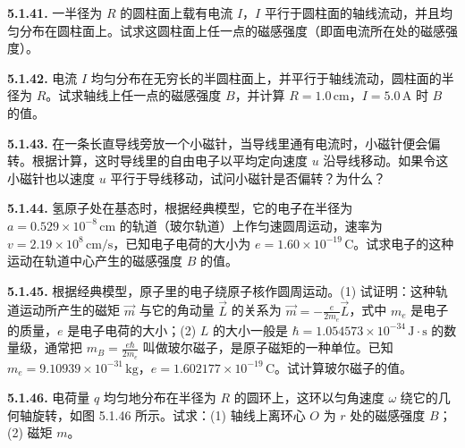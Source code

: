\begin{center}
\end{center}

\vfill
\newpage

\textbf{5.1.41.} 一半径为 $R$ 的圆柱面上载有电流 $I$，$I$ 平行于圆柱面的轴线流动，并且均匀分布在圆柱面上。试求这圆柱面上任一点的磁感强度（即面电流所在处的磁感强度）。

\vfill
\newpage

\textbf{5.1.42.} 电流 $I$ 均匀分布在无穷长的半圆柱面上，并平行于轴线流动，圆柱面的半径为 $R$。试求轴线上任一点的磁感强度 $B$，并计算 $R = 1.0\,\mathrm{cm}$，$I = 5.0\,\mathrm{A}$ 时 $B$ 的值。

\vfill
\newpage

\textbf{5.1.43.} 在一条长直导线旁放一个小磁针，当导线里通有电流时，小磁针便会偏转。根据计算，这时导线里的自由电子以平均定向速度 $u$ 沿导线移动。如果令这小磁针也以速度 $u$ 平行于导线移动，试问小磁针是否偏转？为什么？

\vfill
\newpage

\textbf{5.1.44.} 氢原子处在基态时，根据经典模型，它的电子在半径为 $a = 0.529 \times 10^{-8}\,\mathrm{cm}$ 的轨道（玻尔轨道）上作匀速圆周运动，速率为 $v = 2.19 \times 10^{8}\,\mathrm{cm/s}$，已知电子电荷的大小为 $e = 1.60 \times 10^{-19}\,\mathrm{C}$。试求电子的这种运动在轨道中心产生的磁感强度 $B$ 的值。

\vfill
\newpage

\textbf{5.1.45.} 根据经典模型，原子里的电子绕原子核作圆周运动。(1) 试证明：这种轨道运动所产生的磁矩 $\vec{m}$ 与它的角动量 $\vec{L}$ 的关系为 $\displaystyle \vec{m} = -\frac{e}{2m_{e}}\vec{L}$，式中 $m_{e}$ 是电子的质量，$e$ 是电子电荷的大小；(2) $L$ 的大小一般是 $\hbar = 1.054573 \times 10^{-34}\,\mathrm{J \cdot s}$ 的数量级，通常把 $\displaystyle m_{B} = \frac{e\hbar}{2m_{e}}$ 叫做玻尔磁子，是原子磁矩的一种单位。已知 $m_{e} = 9.10939 \times 10^{-31}\,\mathrm{kg}$，$e = 1.602177 \times 10^{-19}\,\mathrm{C}$。试计算玻尔磁子的值。

\vfill
\newpage

\textbf{5.1.46.} 电荷量 $q$ 均匀地分布在半径为 $R$ 的圆环上，这环以匀角速度 $\omega$ 绕它的几何轴旋转，如图 5.1.46 所示。试求：(1) 轴线上离环心 $O$ 为 $r$ 处的磁感强度 $B$；(2) 磁矩 $m$。

\begin{center}
\end{center}


